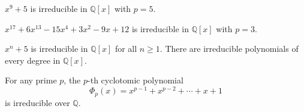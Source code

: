 \begin{example}
    $x^9 + 5$ is irreducible in $\mathbb{Q}[x]$ with $p=5$.
\end{example}

\begin{example}
    $x^{17} + 6x^{13} - 15x^{4} + 3x^2 - 9x + 12$ is irreducible in $\mathbb{Q}[x]$ with $p=3$.
\end{example}

\begin{example}
    $x^n + 5$ is irreducible in $\mathbb{Q}[x]$ for all $n \geq 1$. There are irreducible polynomials of 
    every degree in $\mathbb{Q}[x]$.
\end{example}

\vspace*{6cm}
\begin{corollary}
    For any prime $p$, the $p$-th cyclotomic polynomial
    \[
        \Phi_p(x) = x^{p-1} + x^{p-2} + \cdots + x + 1
    \]
    is irreducible over $\mathbb{Q}$.
\end{corollary}
